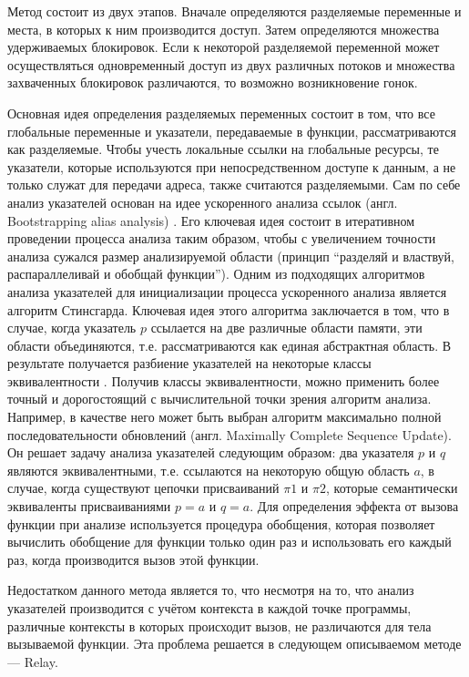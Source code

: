 Метод состоит из двух этапов. Вначале определяются разделяемые переменные и места, в которых к ним производится доступ. Затем определяются множества удерживаемых блокировок. Если к некоторой разделяемой переменной может осуществляться одновременный доступ из двух различных потоков и множества захваченных блокировок различаются, то возможно возникновение гонок.

Основная идея определения разделяемых переменных состоит в том, что все глобальные переменные и указатели, передаваемые в функции, рассматриваются как разделяемые. Чтобы учесть локальные ссылки на глобальные ресурсы, те указатели, которые используются при непосредственном доступе к данным, а не только служат для передачи адреса, также считаются разделяемыми. Сам по себе анализ указателей основан на идее ускоренного анализа ссылок (англ. Bootstrapping alias analysis) \cite{Bootstrapping}. Его ключевая идея состоит в итеративном проведении процесса анализа таким образом, чтобы с увеличением точности анализа сужался размер анализируемой области (принцип “разделяй и властвуй, распараллеливай и обобщай функции”). Одним из подходящих алгоритмов анализа указателей для инициализации процесса ускоренного анализа  является алгоритм Стинсгарда. Ключевая идея этого алгоритма заключается в том, что в случае, когда указатель $p$ ссылается на две различные области памяти, эти области объединяются, т.е. рассматриваются как единая абстрактная область. В результате получается разбиение указателей на некоторые классы эквивалентности \cite{Steensgaard}. Получив классы эквивалентности, можно применить более точный и дорогостоящий с вычислительной точки зрения алгоритм анализа. Например, в качестве него может быть выбран алгоритм максимально полной последовательности обновлений (англ. Maximally Complete Sequence Update). Он решает задачу анализа указателей следующим образом: два указателя $p$ и $q$ являются эквивалентными, т.е. ссылаются на некоторую общую область $a$, в случае, когда существуют цепочки присваиваний $\pi1$ и $\pi2$, которые семантически эквиваленты присваиваниями $p=a$ и $q=a$.  Для определения эффекта от вызова функции при анализе используется процедура обобщения, которая позволяет вычислить обобщение для функции только один раз и использовать его каждый раз, когда производится вызов этой функции.

Недостатком данного метода является то, что несмотря на то, что анализ указателей производится с учётом контекста в каждой точке программы, различные контексты в которых происходит вызов, не различаются для тела вызываемой функции. Эта проблема решается в следующем описываемом методе — Relay.

